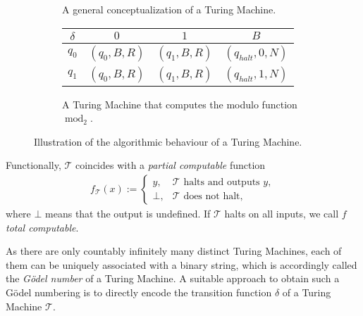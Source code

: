 \begin{figure}[h]
\begin{center}
\begin{subfigure}{0.49\textwidth}
			\caption{A general conceptualization of a Turing Machine.}
			\label{fig:algorithmic-behaviour-turing-machine-general}
		\end{subfigure}\hspace{10pt}
		\begin{subfigure}{0.43\textwidth}
			\begin{tabular}{|c|c|c|c|}
				$\delta$ & $\mspace{35mu}0\mspace{35mu}$ & $\mspace{35mu}1\mspace{35mu}$ & $\mspace{35mu}B\mspace{35mu}$\\\hline
				$q_0$    &  \scriptsize{$(q_{0},B,R)$}   &  \scriptsize{$(q_{1},B,R)$}   &  \scriptsize{$(q_{halt},0,N)$}  \\\hline
				$q_1$    &  \scriptsize{$(q_{0},B,R)$}   &  \scriptsize{$(q_{1},B,R)$}   &  \scriptsize{$(q_{halt},1,N)$}  \\\hline
			\end{tabular}
			\caption{A Turing Machine that computes the modulo function $\operatorname{mod}_2$.}
			\label{fig:tm-modulo-2}
		\end{subfigure}
	\end{center}
	\caption[The algorithmic behaviour of a Turing Machine.]{Illustration of the algorithmic behaviour of a Turing Machine.}
	\label{fig:algorithmic-behaviour-turing-machine}
\end{figure}

Functionally, $\mathcal{T}$ coincides with a \textit{partial computable} function
\begin{align}
	f_{\mathcal{T}}(x):=\begin{cases}
		y, & \mathcal{T} \text{ halts and outputs } y,\\
		\bot, & \mathcal{T} \text{ does not halt},
	\end{cases}
\end{align}
where $\bot$ means that the output is undefined.
If $\mathcal{T}$ halts on all inputs, we call $f$ \textit{total computable}.

As there are only countably infinitely many distinct Turing Machines, each of them can be uniquely associated with a binary string, which is accordingly called the \textit{G\"odel number} of a Turing Machine.
A suitable approach to obtain such a G\"odel numbering is to directly encode the transition function $\delta$ of a Turing Machine $\mathcal{T}$.

